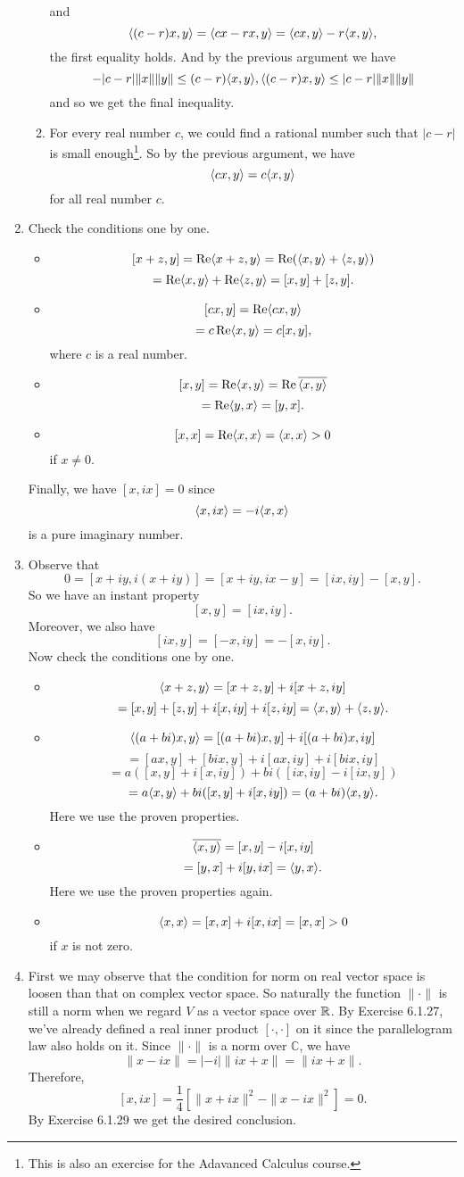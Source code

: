 \begin{enumerate}
\begin{enumerate}
and 
\[\langle (c-r)x,y\rangle =\langle cx-rx,y\rangle =\langle cx,y\rangle -r\langle x,y\rangle ,\]
the first equality holds. And by the previous argument we have 
\[-|c-r|\|x\|\|y\|\leq (c-r)\langle x,y\rangle ,\langle (c-r)x,y\rangle \leq |c-r|\|x\|\|y\|\]
and so we get the final inequality.
\item For every real number $c$, we could find a rational number such that $|c-r|$ is small enough\footnote{This is also an exercise for the Adavanced Calculus course.}. So by the previous argument, we have 
\[\langle cx,y\rangle =c\langle x,y\rangle \]
for all real number $c$.
\end{enumerate}
\item Check the conditions one by one. \begin{itemize}
\item \[[x+z,y]=\operatorname{Re}\langle x+z,y\rangle =\operatorname{Re}(\langle x,y\rangle +\langle z,y\rangle)\]
\[=\operatorname{Re}\langle x,y\rangle +\operatorname{Re}\langle z,y\rangle =[x,y]+[z,y].\]
\item \[[cx,y]=\operatorname{Re}\langle cx,y\rangle \]
\[=c\operatorname{Re}\langle x,y\rangle =c[x,y],\]
where $c$ is a real number.
\item \[[x,y]=\operatorname{Re}\langle x,y\rangle =\operatorname{Re}\overline{\langle x,y\rangle }\]
\[=\operatorname{Re}\langle y,x\rangle =[y,x].\]
\item \[[x,x]=\operatorname{Re}\langle x,x\rangle =\langle x,x\rangle >0\]
if $x\neq 0$.
\end{itemize}
Finally, we have $[x,ix]=0$ since 
\[\langle x,ix\rangle =-i\langle x,x\rangle \]
is a pure imaginary number.
\item Observe that 
\[0=[x+iy,i(x+iy)]=[x+iy,ix-y]=[ix,iy]-[x,y].\]
So we have an instant property 
\[[x,y]=[ix,iy].\]
Moreover, we also have
\[
    [ix, y] = [-x, iy] = -[x, iy].
\]
Now check the conditions one by one. \begin{itemize}
\item \[\langle x+z,y\rangle =[x+z,y]+i[x+z,iy]\]
\[=[x,y]+[z,y]+i[x,iy]+i[z,iy]=\langle x,y\rangle +\langle z,y\rangle .\]
\item \[\langle (a+bi)x,y\rangle =[(a+bi)x,y]+i[(a+bi)x,iy]\]
\[=[ax,y]+[bix,y]+i[ax,iy]+i[bix,iy]\]
\[=a([x,y]+i[x,iy])+bi([ix,iy]-i[ix,y])\]
\[=a\langle x,y\rangle +bi([x,y]+i[x,iy])=(a+bi)\langle x,y\rangle .\]
Here we use the proven properties.
\item \[\overline{\langle x,y\rangle}=[x,y]-i[x,iy]\]
\[=[y,x]+i[y,ix]=\langle y,x\rangle .\]
Here we use the proven properties again.
\item \[\langle x,x\rangle =[x,x]+i[x,ix]=[x,x]>0\]
if $x$ is not zero.
\end{itemize}
\item First we may observe that the condition for norm on real vector space is loosen than that on complex vector space. So naturally the function $\|\cdot \|$ is still a norm when we regard $V$ as a vector space over $\mathbb{R}$. By Exercise 6.1.27, we've already defined a real inner product $[\cdot ,\cdot ]$ on it since the parallelogram law also holds on it.  Since $\|\cdot\|$ is a norm over $\mathbb{C}$, we have
\[
    \|x - ix\| = |-i|\|ix + x\| = \|ix + x\|.
\]
Therefore,
\[
    [x,ix] = \frac{1}{4}[\|x+ix\|^2-\|x-ix\|^2] = 0.
\]
By Exercise 6.1.29 we get the desired conclusion.
\end{enumerate}
